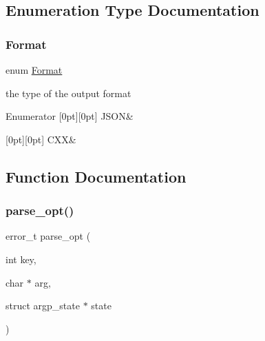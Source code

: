 \subsection{Enumeration Type Documentation}
\mbox{\label{arg-info_8h_ab4e88c89b3b7ea1735996cc4def22d58}} 
\subsubsection{\texorpdfstring{Format}{Format}}
{\footnotesize\ttfamily enum \hyperlink{arg-info_8h_ab4e88c89b3b7ea1735996cc4def22d58}{Format}}



the type of the output format 

\begin{DoxyEnumFields}{Enumerator}
[0pt][0pt]{}\mbox{\label{arg-info_8h_ab4e88c89b3b7ea1735996cc4def22d58aa5210511e3859748f136ab50c313ef05}} 
J\+S\+ON&\\
\hline

[0pt][0pt]{}\mbox{\label{arg-info_8h_ab4e88c89b3b7ea1735996cc4def22d58afde1c37e079bb0efad8943458c4c6da8}} 
C\+XX&\\
\hline

\end{DoxyEnumFields}


\subsection{Function Documentation}
\mbox{\label{arg-info_8h_a5fb6abc38ef248ec154591e0dd392c1b}} 
\subsubsection{\texorpdfstring{parse\+\_\+opt()}{parse\_opt()}}
{\footnotesize\ttfamily error\+\_\+t parse\+\_\+opt (\begin{DoxyParamCaption}\item[{int}]{key,  }\item[{char $\ast$}]{arg,  }\item[{struct argp\+\_\+state $\ast$}]{state }\end{DoxyParamCaption})}



